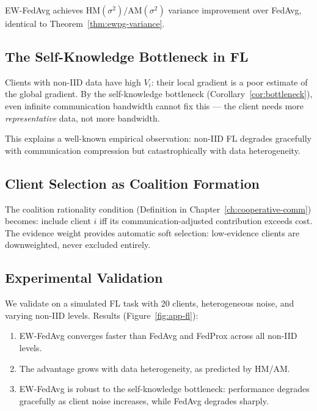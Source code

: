 \begin{theorem}
EW-FedAvg achieves $\text{HM}(\sigma^2)/\text{AM}(\sigma^2)$ variance improvement over FedAvg, identical to Theorem~\ref{thm:ewpg-variance}.
\end{theorem}

\subsection{The Self-Knowledge Bottleneck in FL}

Clients with non-IID data have high $V_i$: their local gradient is a poor estimate of the global gradient. By the self-knowledge bottleneck (Corollary~\ref{cor:bottleneck}), even infinite communication bandwidth cannot fix this --- the client needs more \emph{representative} data, not more bandwidth.

This explains a well-known empirical observation: non-IID FL degrades gracefully with communication compression but catastrophically with data heterogeneity.

\subsection{Client Selection as Coalition Formation}

The coalition rationality condition (Definition in Chapter~\ref{ch:cooperative-comm}) becomes: include client $i$ iff its communication-adjusted contribution exceeds cost. The evidence weight provides automatic soft selection: low-evidence clients are downweighted, never excluded entirely.

\subsection{Experimental Validation}

We validate on a simulated FL task with 20 clients, heterogeneous noise, and varying non-IID levels. Results (Figure~\ref{fig:app-fl}):

\begin{enumerate}
    \item EW-FedAvg converges faster than FedAvg and FedProx across all non-IID levels.
    \item The advantage grows with data heterogeneity, as predicted by HM/AM.
    \item EW-FedAvg is robust to the self-knowledge bottleneck: performance degrades gracefully as client noise increases, while FedAvg degrades sharply.
\end{enumerate}

